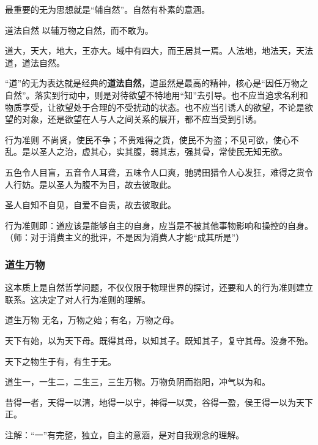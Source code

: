 \documentclass{ctexart}
\begin{document}
最重要的无为思想就是“辅自然”。自然有朴素的意涵。

\begin{fancybox}{道法自然}
    以辅万物之自然，而不敢为。
    
    道大，天大，地大，王亦大。域中有四大，而王居其一焉。人法地，地法天，天法道，道法自然。
\end{fancybox}

“道”的无为表达就是经典的\textbf{道法自然}，道虽然是最高的精神，核心是“因任万物之自然”。落实到行动中，则是对待欲望不特地用“知”去引导。也不应当追求名利和物质享受，让欲望处于合理的不受扰动的状态。也不应当引诱人的欲望，不论是欲望的对象，还是欲望在人与人之间关系的展开，都不应当受到引诱。

\begin{fancybox}{行为准则}
    不尚贤，使民不争；不贵难得之货，使民不为盗；不见可欲，使心不乱。是以圣人之治，虚其心，实其腹，弱其志，强其骨，常使民无知无欲。
    
    五色令人目盲，五音令人耳聋，五味令人口爽，驰骋田猎令人心发狂，难得之货令人行妨。是以圣人为腹不为目，故去彼取此。
    
    圣人自知不自见，自爱不自贵，故去彼取此。
\end{fancybox}

行为准则即：道应该是能够自主的自身，应当是不被其他事物影响和操控的自身。（师：对于消费主义的批评，不是因为消费人才能“成其所是”）

\subsubsection{道生万物}

这本质上是自然哲学问题，不仅仅限于物理世界的探讨，还要和人的行为准则建立联系。这决定了对人行为准则的理解。

\begin{fancybox}{道生万物}
    无名，万物之始；有名，万物之母。
    
    天下有始，以为天下母。既得其母，以知其子。既知其子，复守其母。没身不殆。

    天下之物生于有，有生于无。

    道生一，一生二，二生三，三生万物。万物负阴而抱阳，冲气以为和。
       
    昔得一者，天得一以清，地得一以宁，神得一以灵，谷得一盈，侯王得一以为天下正。
\end{fancybox}

注解：“一”有完整，独立，自主的意涵，是对自我观念的理解。
\end{document}

